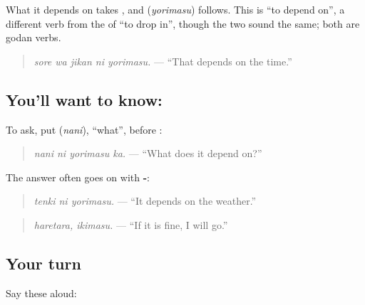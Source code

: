 What it depends on takes \textbf{}, and \textbf{} (\emph{yorimasu}) follows. This \textbf{} is \textquotedblleft{}to depend on\textquotedblright{}, a different verb from the \textbf{} of \textbf{} \textquotedblleft{}to drop in\textquotedblright{}, though the two sound the same; both are godan verbs.

\begin{quote}
\textbf{  }
\end{quote}

\begin{quote}
\emph{sore wa jikan ni yorimasu.} — \textquotedblleft{}That depends on the time.\textquotedblright{}
\end{quote}

\subsection*{You'll want to know:  }
To ask, put \textbf{} (\emph{nani}), \textquotedblleft{}what\textquotedblright{}, before \textbf{}:

\begin{quote}
\textbf{ }
\end{quote}

\begin{quote}
\emph{nani ni yorimasu ka.} — \textquotedblleft{}What does it depend on?\textquotedblright{}
\end{quote}

The answer often goes on with \textbf{-}:

\begin{quote}
\textbf{ }
\end{quote}

\begin{quote}
\emph{tenki ni yorimasu.} — \textquotedblleft{}It depends on the weather.\textquotedblright{}
\end{quote}

\begin{quote}
\textbf{}
\end{quote}

\begin{quote}
\emph{haretara, ikimasu.} — \textquotedblleft{}If it is fine, I will go.\textquotedblright{}
\end{quote}

\subsection*{Your turn}
Say these aloud:

